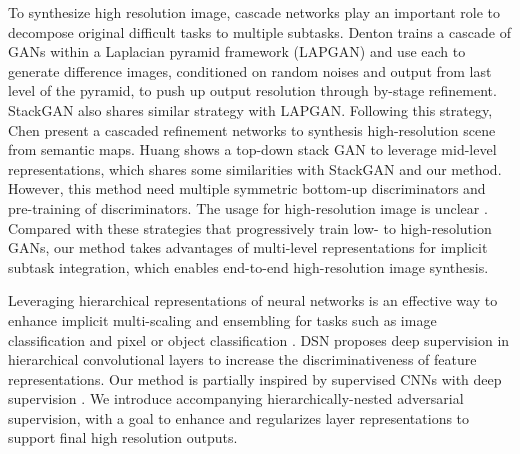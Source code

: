 \documentclass[10pt,twocolumn,letterpaper]{article}
\begin{document}
To synthesize high resolution image, cascade networks play an important role to decompose original difficult tasks to multiple subtasks.
Denton \etal \cite{denton2015deep} trains a cascade of GANs within a Laplacian pyramid framework (LAPGAN) and use each to generate difference images, conditioned on random noises and output from last level of the pyramid, to push up output resolution through by-stage refinement. StackGAN also shares similar strategy with LAPGAN. Following this strategy, Chen \etal \cite{chen2017photographic} present a cascaded refinement networks to synthesis high-resolution scene from semantic maps. 
Huang \etal \cite{huang2016stacked}
shows a top-down stack GAN to leverage mid-level representations, which shares some similarities with StackGAN and our method. However, this method need multiple symmetric  bottom-up discriminators and pre-training of discriminators. The usage for high-resolution image is unclear \cite{han2017stackgan}. Compared with these strategies that progressively train low- to high-resolution GANs, our method takes advantages of multi-level representations for implicit subtask integration, which enables end-to-end high-resolution image synthesis.


Leveraging hierarchical representations of neural networks is an effective way to enhance implicit multi-scaling and ensembling for tasks such as image classification \cite{lee2015deeply} and pixel or object classification \cite{xie2015holistically,cai2016unified,long2015fully}. DSN \cite{lee2015deeply} proposes deep supervision in hierarchical convolutional layers to increase the discriminativeness of feature representations. 
Our method is partially inspired by supervised CNNs with deep supervision \cite{lee2015deeply,xie2015holistically}. We introduce accompanying hierarchically-nested adversarial supervision, with a goal to enhance and regularizes layer representations to support final high resolution outputs.   
\begin{figure}[t]
	\centering
	\caption{} \label{fig:archs}
\end{figure}

%
%
%
\begin{figure}[t]
	\centering
	\caption{} \label{fig:archs-compare}
\end{figure}
\end{document}
